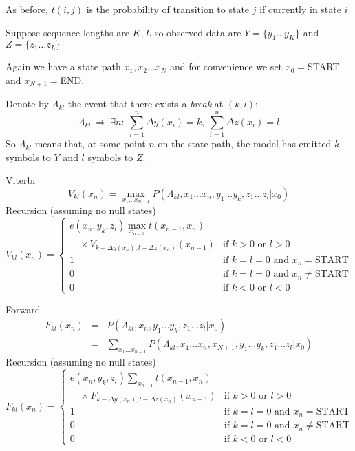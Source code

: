 \documentclass{beamer}
\begin{document}
\begin{frame}{}

\itemb
\item As before, $t(i,j)$ is the probability of transition to state $j$ if currently in state $i$
\item Suppose sequence lengths are $K,L$ so observed data are $Y = \{ y_1 \ldots y_K \}$ and $Z = \{ z_1 \ldots z_L \}$
\item Again we have a state path $x_1, x_2 \ldots x_N$
 and for convenience we set $x_0=$START and $x_{N+1}=$END.
 \itemb
 \item Denote by $\Lambda_{kl}$ the event that there exists a {\em break} at $(k,l)$:
\[
\Lambda_{kl}\ \Rightarrow\ \exists n:
\ \sum_{i=1}^n \Delta y(x_i)=k,
\ \sum_{i=1}^n \Delta z(x_i)=l
\]
So $\Lambda_{kl}$ means that,
at some point $n$ on the state path, the model
has emitted $k$ symbols to $Y$ and $l$ symbols to $Z$.
 \iteme
\iteme

\end{frame}

\begin{frame}{}

\small
Viterbi
\[
V_{kl}(x_n) = \max_{x_1 \ldots x_{n-1}}
P \left( \Lambda_{kl},x_1 \ldots x_n,y_1 \ldots y_k,z_1 \ldots z_l | x_0 \right)
\]
Recursion (assuming no null states)
\[
V_{kl}(x_n) = \left\{ \begin{array}{ll} \displaystyle
e(x_n,y_k,z_l) \max_{x_{n-1}} t(x_{n-1},x_n) & \\ \quad \times
V_{k-\Delta y(x_n),l-\Delta z(x_n)}(x_{n-1}) & \mbox{if $k > 0$ or $l > 0$} \\
1 & \mbox{if $k=l=0$ and $x_n=$START} \\
0 & \mbox{if $k=l=0$ and $x_n\neq$START} \\
0 & \mbox{if $k < 0$ or $l < 0$}
\end{array} \right.
\]

\end{frame}

\begin{frame}{}

\small
Forward
\begin{eqnarray*}
F_{kl}(x_n)
& = & P \left( \Lambda_{kl},x_n,y_1 \ldots y_k,z_1 \ldots z_l | x_0 \right) \\
& = & \sum_{x_1 \ldots x_{n-1}}
P \left( \Lambda_{kl},x_1 \ldots x_n,x_{N+1},y_1 \ldots y_k,z_1 \ldots z_l | x_0 \right)
\end{eqnarray*}
Recursion (assuming no null states)
\[
F_{kl}(x_n) = \left\{ \begin{array}{ll} \displaystyle
e(x_n,y_k,z_l) \sum_{x_{n-1}} t(x_{n-1},x_n) & \\ \quad \times
F_{k-\Delta y(x_n),l-\Delta z(x_n)}(x_{n-1}) & \mbox{if $k > 0$ or $l > 0$} \\
1 & \mbox{if $k=l=0$ and $x_n=$START} \\
0 & \mbox{if $k=l=0$ and $x_n\neq$START} \\
0 & \mbox{if $k < 0$ or $l < 0$}
\end{array} \right.
\]

\end{frame}
\end{document}
